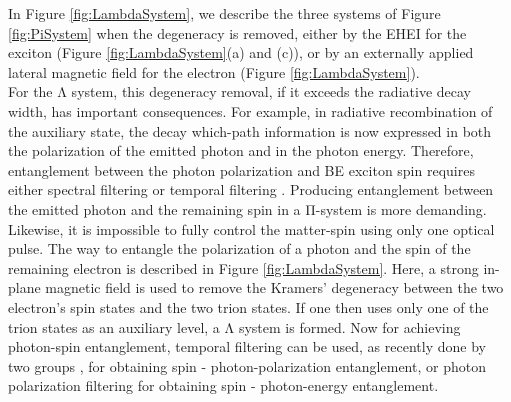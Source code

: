 In Figure \ref{fig:LambdaSystem}, we describe the three systems of Figure \ref{fig:PiSystem} when the degeneracy is removed, either by the EHEI for the exciton (Figure \ref{fig:LambdaSystem}(a) and
(c)), or by an externally applied lateral magnetic field for the electron (Figure \ref{fig:LambdaSystem}).\\
For the Λ system, this degeneracy removal, if it exceeds the radiative decay width, has important consequences. For example, in radiative recombination of the auxiliary state, the decay  which-path information is now expressed in both the polarization of the emitted photon and in the photon energy. Therefore, entanglement between the photon polarization and BE exciton spin requires either spectral filtering \cite{Hafenbrak2007} or temporal filtering \cite{Akopian2006}.
Producing entanglement between the emitted photon and the remaining spin in a Π-system is more demanding. Likewise, it is impossible to fully control the matter-spin using only one optical pulse. The way to entangle the polarization of a photon and the spin of the remaining electron is described in Figure \ref{fig:LambdaSystem}. Here, a strong in-plane magnetic field is used to remove the Kramers' degeneracy between the two electron's spin states and the two trion states. If one then uses only one of the trion states as an auxiliary level, a Λ system is formed. Now for achieving photon-spin entanglement, temporal filtering can be used, as recently done by two groups \cite{DeGreve2012} \cite{Schaibley2013}, for obtaining spin - photon-polarization entanglement, or photon polarization filtering \cite{Gao2012} for obtaining spin - photon-energy entanglement.
